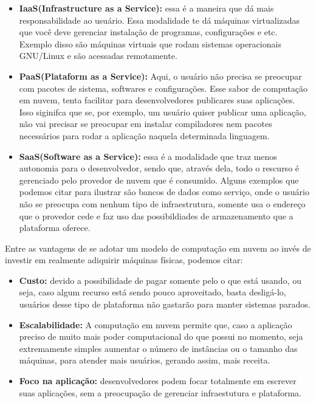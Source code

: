 \documentclass[11pt,twoside]{article}
\begin{document}
\begin{itemize}

  \item \textbf{IaaS(Infrastructure as a Service):} essa é a maneira que dá mais responsabilidade ao usuário. Essa modalidade te dá máquinas virtualizadas que você deve gerenciar 
  instalação de programas, configurações e etc. Exemplo disso são máquinas virtuais que rodam sistemas operacionais GNU/Linux e são acessadas remotamente.
  \item \textbf{PaaS(Plataform as a Service):} Aqui, o usuário não precisa se preocupar com pacotes de sistema, softwares e configurações. Esse sabor de computação em nuvem, tenta 
  facilitar para desenvolvedores publicares suas aplicações. Isso siginifca que se, por exemplo, um usuário quiser publicar uma aplicação, não vai precisar se preocupar em
  instalar compiladores nem pacotes necessários para rodar a aplicação naquela determinada linguagem.
  \item \textbf{SaaS(Software as a Service):} essa é a modalidade que traz menos autonomia para o desenvolvedor, sendo que, através dela, todo o rescurso é gerenciado pelo provedor de 
  nuvem que é consumido. Alguns exemplos que podemos citar para ilustrar são bancos de dados como serviço, onde o usuário não se preocupa com nenhum tipo de infraestrutura, 
  somente usa o endereço que o provedor cede e faz uso das possibildiades de armazenamento que a plataforma oferece.

\end{itemize}

Entre as vantagens de se adotar um modelo de computação em nuvem ao invés de investir em realmente adiquirir máquinas físicas, podemos citar:

\begin{itemize}
  \item \textbf{Custo:} devido a possibilidade de pagar somente pelo o que está usando, ou seja, caso algum recurso está sendo pouco aproveitado, basta desligá-lo, usuários desse tipo de 
  plataforma não gastarão para manter sistemas parados.
  \item \textbf{Escalabilidade:} A computação em nuvem permite que, caso a aplicação preciso de muito mais poder computacional do que possui no momento, seja extremamente simples aumentar
  o número de instâncias ou o tamanho das máquinas, para atender mais usuários, gerando assim, mais receita.
  \item \textbf{Foco na aplicação:} desenvolvedores podem focar totalmente em escrever suas aplicações, sem a preocupação de gerenciar infraestutura e plataforma.

\end{itemize}
\end{document}
